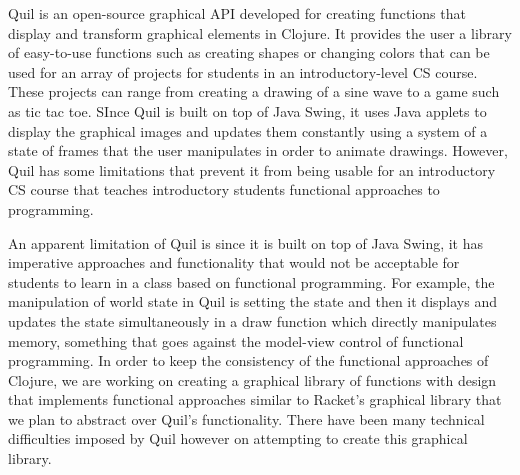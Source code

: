 \documentclass[12pt]{article}
\begin{document}
Quil is an open-source graphical API developed for creating functions that display and transform graphical elements in Clojure. It provides the user a library of easy-to-use functions such as creating shapes or changing colors that can be used for an array of projects for students in an introductory-level CS course. These projects can range from creating a drawing of a sine wave to a game such as tic tac toe. SInce Quil is built on top of Java Swing, it uses Java applets to display the graphical images and updates them constantly using a system of a state of frames that the user manipulates in order to animate drawings. However, Quil has some limitations that prevent it from being usable for an introductory CS course that teaches introductory students functional approaches to programming.

An apparent limitation of Quil is since it is built on top of Java Swing, it has imperative approaches and functionality that would not be acceptable for students to learn in a class based on functional programming. For example, the manipulation of world state in Quil is setting the state and then it displays and updates the state simultaneously in a draw function which directly manipulates memory, something that goes against the model-view control of functional programming. In order to keep the consistency of the functional approaches of Clojure, we are working on creating a graphical library of functions with design that implements functional approaches similar to Racket’s graphical library that we plan to abstract over Quil’s functionality. There have been many technical difficulties imposed by Quil however on attempting to create this graphical library.
\end{document}
